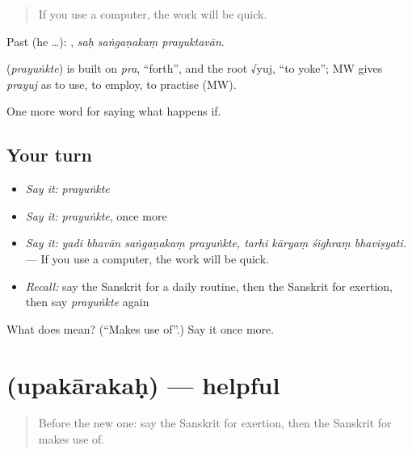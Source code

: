\begin{quote}
If you use a computer, the work will be quick.
\end{quote}

Past (he …):   , \emph{saḥ saṅgaṇakaṃ prayuktavān}.

\begin{cousinweb}
\textbf{} (\emph{prayuṅkte}) is built on \emph{pra}, \textquotedblleft{}forth\textquotedblright{}, and the root √yuj, \textquotedblleft{}to yoke\textquotedblright{}; MW gives \emph{prayuj} as to use, to employ, to practise (MW).
\end{cousinweb}

\begin{grammarlens}[title={What you've built}]
One more word for saying what happens if.
\end{grammarlens}

\subsection*{Your turn}
\begin{itemize}
\raggedright
  \item \emph{Say it:} \emph{prayuṅkte}
  \item \emph{Say it:} \emph{prayuṅkte}, once more
  \item \emph{Say it:} \emph{yadi bhavān saṅgaṇakaṃ prayuṅkte, tarhi kāryaṃ śīghraṃ bhaviṣyati.} — If you use a computer, the work will be quick.
  \item \emph{Recall:} say the Sanskrit for a daily routine, then the Sanskrit for exertion, then say \emph{prayuṅkte} again
\end{itemize}

\begin{tcolorbox}[breakable,colback=teal!4,colframe=teal!35!black,title={Before you move on}]
What does  mean? (\textquotedblleft{}Makes use of\textquotedblright{}.) Say it once more.
\end{tcolorbox}
\section[\texorpdfstring{\sk{उपकारकः} (upakārakaḥ)}{उपकारकः (upakārakaḥ)}]{ (upakārakaḥ) — helpful}

\label{lesson:SA-C552-upakarakah}



\begin{quote}
Before the new one: say the Sanskrit for exertion, then the Sanskrit for makes use of.
\end{quote}

